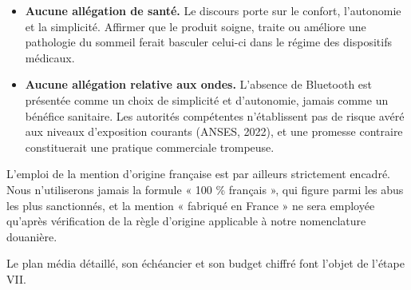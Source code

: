 \begin{itemize}
  \item \textbf{Aucune allégation de santé.} Le discours porte sur le confort,
        l'autonomie et la simplicité. Affirmer que le produit soigne, traite ou
        améliore une pathologie du sommeil ferait basculer celui-ci dans le
        régime des dispositifs médicaux.
  \item \textbf{Aucune allégation relative aux ondes.} L'absence de Bluetooth
        est présentée comme un choix de simplicité et d'autonomie, jamais comme
        un bénéfice sanitaire. Les autorités compétentes n'établissent pas de
        risque avéré aux niveaux d'exposition courants (ANSES, 2022), et une
        promesse contraire constituerait une pratique commerciale trompeuse.
\end{itemize}

L'emploi de la mention d'origine française est par ailleurs strictement encadré.
Nous n'utiliserons jamais la formule « 100 \% français », qui figure parmi les
abus les plus sanctionnés, et la mention « fabriqué en France » ne sera employée
qu'après vérification de la règle d'origine applicable à notre nomenclature
douanière.

Le plan média détaillé, son échéancier et son budget chiffré font l'objet de
l'étape VII.
